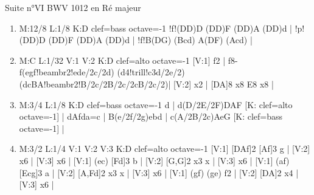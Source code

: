 \documentclass[a4paper,twoside]{article}
\begin{document}
\begin{center}
\Large Suite n°VI BWV 1012 en Ré majeur
\end{center}

\vspace{3cm}

%
%
\large
\settowidth{\titlelen}{Allemande}
\addtolength{\titlelen}{0.5em}
\setlength{\titleseplen}{1cm}
\begin{enumerate}
  \item {}
\begin{abcsvg}
  M:12/8
  L:1/8
  K:D clef=bass octave=-1
  !f!(DD)D (DD)F (DD)A (DD)d |
  !p!(DD)D (DD)F (DD)A (DD)d |
  !f!B(DG) (Bcd) A(DF) (Acd) |
\end{abcsvg}
\makebox[2cm][l]{ \dotfill\ \pageref{VIprelude}}
\par\vspace{\titleseplen}

  \item {}
\begin{abcsvg}
  M:C
  L:1/32
  V:1
  V:2
  K:D clef=alto octave=-1
  [V:1] f2 | f8- f(egf!beambr2!ede/2c/2d) (d4!trill!c3d/2e/2) (dcBA!beambr2!B/2c/2B/2c/2cB/2c/2)|
  [V:2] x2 | [DA]8 x8             E8                    x8    |
\end{abcsvg}
\makebox[2cm][l]{ \dotfill\ \pageref{VIallemande}}
\par\vspace{\titleseplen}

  \item {}
\begin{abcsvg}
  M:3/4
  L:1/8
  K:D clef=bass octave=-1
  d | d(D/2E/2F)DAF [K: clef=alto octave=-1] |
  dAfda=c |
  B(e/2f/2g)ebd |
  c(A/2B/2c)AeG [K: clef=bass octave=-1] |
\end{abcsvg}
\makebox[2cm][l]{ \dotfill\ \pageref{VIcourante}}
\par\vspace{\titleseplen}

  \item {}
\begin{abcsvg}
  M:3/2
  L:1/4
  V:1
  V:2
  V:3
  K:D clef=alto octave=-1
  [V:1] [DAf]2 [Af]3 g |
  [V:2] x6 |
  [V:3] x6 |
  [V:1] (ec)   [Fd]3 b |
  [V:2] [G,G]2  x3 x |
  [V:3] x6 |
  [V:1] (af) [Ecg]3 a |
  [V:2] [A,Fd]2  x3 x |
  [V:3] x6 |
  [V:1] (gf) (ge) f2 |
  [V:2] [DA]2 x4 |
  [V:3] x6 |
\end{abcsvg}
\makebox[2cm][l]{ \dotfill\ \pageref{VIsarabande}}
\par\vspace{\titleseplen}


\end{enumerate}
\end{document}
